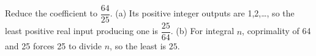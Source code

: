 Reduce the coefficient to $\dfrac{64}{25}$. (a) Its positive integer outputs are 1,2,\ldots, so the least positive real input producing one is $\boxed{\dfrac{25}{64}}$. (b) For integral $ n $, coprimality of 64 and 25 forces 25 to divide $ n $, so the least is $\boxed{25}$.
